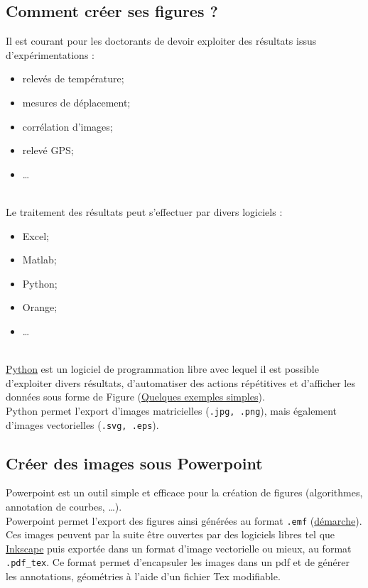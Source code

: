 \documentclass[a4paper,12pt]{report}
\begin{document}
\subsection{Comment créer ses figures ?}
Il est courant pour les doctorants de devoir exploiter des résultats issus d'expérimentations :
\begin{itemize}
\item relevés de température;
\item mesures de déplacement;
\item corrélation d'images;
\item relevé GPS;
\item \ldots
\end{itemize}

\ \\

Le traitement des résultats peut s'effectuer par divers logiciels :
\begin{itemize}
\item Excel;
\item Matlab;
\item Python;
\item Orange;
\item \ldots
\end{itemize}

\ \\

\href{https://www.anaconda.com/download/}{Python} est un logiciel de programmation libre avec lequel il est possible d'exploiter divers résultats, d'automatiser des actions répétitives et d'afficher les données sous forme de Figure (\href{https://github.com/JeanCollomb/Python_plot}{Quelques exemples simples}). \\

Python permet l'export d'images matricielles (\verb|.jpg, .png|), mais également d'images vectorielles (\verb|.svg, .eps|).


\subsection{Créer des images sous Powerpoint}
Powerpoint est un outil simple et efficace pour la création de figures (algorithmes, annotation de courbes, \ldots). \\

Powerpoint permet l'export des figures ainsi générées au format \verb|.emf| (\href{http://saf.bio.caltech.edu/PPT_G_P_I/}{démarche}). Ces images peuvent par la suite être ouvertes par des logiciels libres tel que \href{https://inkscape.org/fr/}{Inkscape} puis exportée dans un format d'image vectorielle ou mieux, au format \verb|.pdf_tex|. Ce format permet d'encapsuler les images dans un pdf et de générer les annotations, géométries à l'aide d'un fichier Tex modifiable. \\
\end{document}
